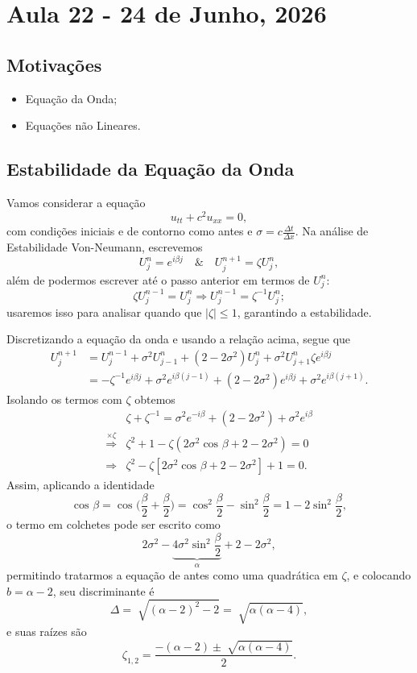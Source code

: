 \documentclass[../differential_methods.tex]{subfiles}
\begin{document}
\section{Aula 22 - 24 de Junho, 2026}
\subsection{Motivações}
\begin{itemize}
	\item Equação da Onda;
	\item Equações não Lineares.
\end{itemize}
\subsection{Estabilidade da Equação da Onda}
Vamos considerar a equação
\[
	u_{tt} + c^{2}u_{xx} = 0,
\]
com condições iniciais e de contorno como antes e \(\sigma = c \frac{\Delta t}{\Delta x}\). Na análise de Estabilidade Von-Neumann, escrevemos
\[
	U_{j}^{n}=e^{i\beta j} \quad\&\quad U_{j}^{n+1} = \zeta U_{j}^{n},
\]
além de podermos escrever até o passo anterior em termos de \(U_{j}^{n}\):
\[
	\zeta U_{j}^{n-1} = U_{j}^{n} \Rightarrow U_{j}^{n-1} = \zeta^{-1}U_{j}^{n};
\]
usaremos isso para analisar quando que \(| \zeta  | \leq 1\), garantindo a estabilidade.

Discretizando a equação da onda e usando a relação acima, segue que
\begin{align*}
	U_{j}^{n+1} & = U_{j}^{n-1} + \sigma^{2}U_{j-1}^{n} + (2-2\sigma^{2})U_{j}^{n} + \sigma^{2}U_{j+1}^{n}\zeta e^{i\beta j}    \\
	            & = -\zeta^{-1}e^{i\beta j}+\sigma^{2} e^{i\beta (j-1)}+(2-2\sigma^{2})e^{i\beta j}+\sigma^{2}e^{i\beta (j+1)}.
\end{align*}
Isolando os termos com \(\zeta \) obtemos
\begin{align*}
	                                    & \zeta +\zeta^{-1}=\sigma^{2}e^{-i\beta }+(2-2\sigma^{2})+\sigma^{2}e^{i\beta } \\
	\stackrel{\times \zeta }\Rightarrow & \zeta^{2}+ 1 - \zeta(2\sigma^{2}\cos^{}{\beta } + 2 - 2\sigma^{2})=0           \\
	\Rightarrow                         & \zeta^{2}-\zeta [2\sigma^{2}\cos^{}{\beta }+2-2\sigma^{2}] + 1 = 0.
\end{align*}
Assim, aplicando a identidade
\[
	\cos^{}{\beta } = \cos^{}{\biggl(\frac{\beta }{2} + \frac{\beta }{2}\biggr)} = \cos^{2}{\frac{\beta }{2}}-\sin^{2}{\frac{\beta }{2}} = 1-2\sin^{2}{\frac{\beta }{2}},
\]
o termo em colchetes pode ser escrito como
\[
	2\sigma^{2} - \underbrace{4\sigma^{2}\sin^{2}{\frac{\beta }{2}}}_{\alpha } + 2 - 2\sigma^{2},
\]
permitindo tratarmos a equação de antes como uma quadrática em \(\zeta \), e colocando \(b = \alpha -2\), seu discriminante é
\[
	\Delta  = \sqrt[]{(\alpha -2)^{2}-2} = \sqrt[]{\alpha (\alpha -4)},
\]
e suas raízes são
\[
	\zeta_{1, 2} = \frac{-(\alpha -2) \pm \sqrt[]{\alpha (\alpha -4)}}{2}.
\]
\end{document}
